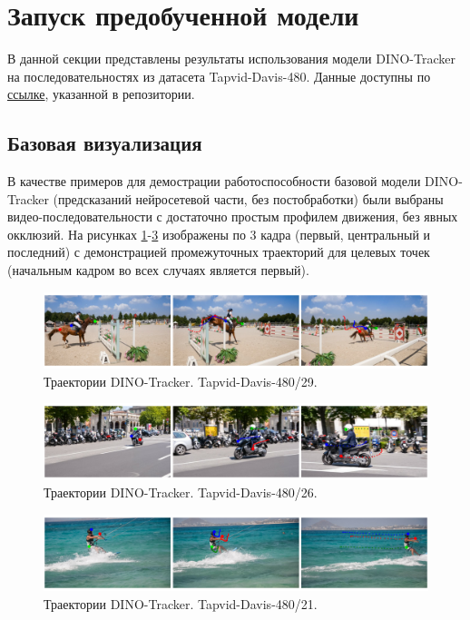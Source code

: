 \documentclass[a4paper, 14pt]{extarticle}
\theoremstyle{definition}
\theoremstyle{plain}
\theoremstyle{remark}
\begin{document}
\newpage

\section{Запуск предобученной модели}
В данной секции представлены результаты использования модели DINO-Tracker на последовательностях из датасета 
Tapvid-Davis-480. Данные доступны по \href{https://www.dropbox.com/scl/fo/7s2rgsm92qbzzh2xnx51d/AIvXxRaJPL2RQm43Zi_taJU?e=1&preview=davis_480.zip&rlkey=6cs0bm2u0on1u7z0jyxlq8avq&st=7s75r77a&dl=0}{ссылке}, указанной в репозитории.
\subsection{Базовая визуализация}
В качестве примеров для демострации работоспособности базовой модели DINO-Tracker (предсказаний нейросетевой части, без постобработки) были выбраны видео-последовательности с достаточно простым профилем движения, без явных окклюзий. На рисунках \ref{fig:davis-29}-\ref{fig:davis-21} изображены по 3 кадра (первый, центральный и последний) с демонстрацией промежуточных траекторий для целевых точек (начальным кадром во всех случаях является первый).
\begin{figure}
    [H]
    \centering
    \includegraphics[width=\textwidth]{figs/davis-29.png}
    \caption{Траектории DINO-Tracker. Tapvid-Davis-480/29.}
    \label{fig:davis-29}
\end{figure}
\begin{figure}
    [H]
    \centering
    \includegraphics[width=\textwidth]{figs/davis-26.png}
    \caption{Траектории DINO-Tracker. Tapvid-Davis-480/26.}
    \label{fig:davis-26}
\end{figure}
\begin{figure}
    [H]
    \centering
    \includegraphics[width=\textwidth]{figs/davis-21.png}
    \caption{Траектории DINO-Tracker. Tapvid-Davis-480/21.}
    \label{fig:davis-21}
\end{figure}
\end{document}
